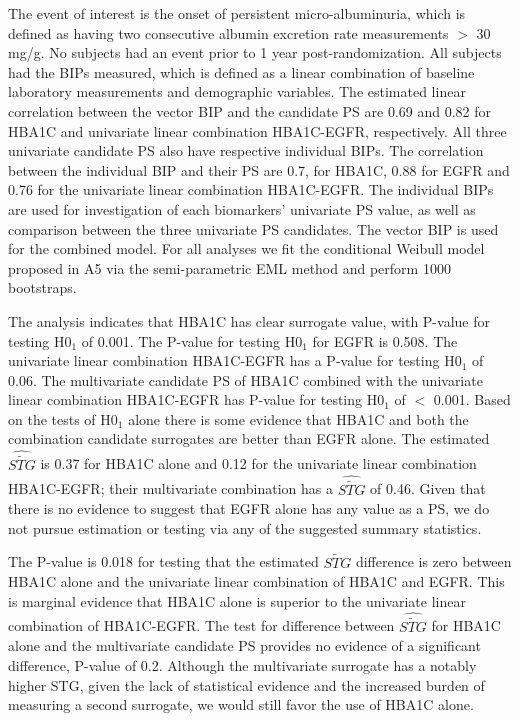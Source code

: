 \documentclass[times, doublespace]{simauth}
\begin{document}
The event of interest is the onset of persistent micro-albuminuria, which is defined as having two consecutive albumin excretion rate measurements $>$ 30 mg/g. No subjects had an event prior to 1 year post-randomization. All subjects had the BIPs measured, which is defined as a linear combination of baseline laboratory measurements and demographic variables. The estimated linear correlation between the vector BIP and the candidate PS are 0.69 and 0.82 for HBA1C and univariate linear combination HBA1C-EGFR, respectively. All three univariate candidate PS also have respective individual BIPs. The correlation between the individual BIP and their PS are 0.7, for HBA1C, 0.88 for EGFR and 0.76 for the univariate linear combination HBA1C-EGFR. The individual BIPs are used for investigation of each biomarkers' univariate PS value, as well as comparison between the three univariate PS candidates. The vector BIP is used for the combined model. For all analyses we fit the conditional Weibull model proposed in A5 via the semi-parametric EML method and perform 1000 bootstraps. 

The analysis indicates that HBA1C has clear surrogate value, with P-value for testing H0$_1$ of 0.001. The P-value for testing H0$_1$ for EGFR is 0.508. The univariate linear combination HBA1C-EGFR has a P-value for testing H0$_1$ of 0.06. The multivariate candidate PS of HBA1C combined with the univariate linear combination HBA1C-EGFR has P-value for testing H0$_1$ of $<$ 0.001. Based on the tests of H0$_1$ alone there is some evidence that HBA1C and both the combination candidate surrogates are better than EGFR alone. The estimated $\widehat{\widetilde{STG}}$ is 0.37 for HBA1C alone and 0.12 for the univariate linear combination HBA1C-EGFR; their multivariate combination has a $\widehat{\widetilde{STG}}$ of 0.46. Given that there is no evidence to suggest that EGFR alone has any value as a PS, we do not pursue estimation or testing via any of the suggested summary statistics.

The P-value is 0.018 for testing that the estimated $\widetilde{STG}$ difference is zero between HBA1C alone and the univariate linear combination of HBA1C and EGFR. This is marginal evidence that HBA1C alone is superior to the univariate linear combination of HBA1C-EGFR. The test for difference between $\widehat{\widetilde{STG}}$ for HBA1C alone and the multivariate candidate PS provides no evidence of a significant difference, P-value of 0.2. Although the multivariate surrogate has a notably higher STG, given the lack of statistical evidence and the increased burden of measuring a second surrogate, we would still favor the use of HBA1C alone. 
\end{document}
